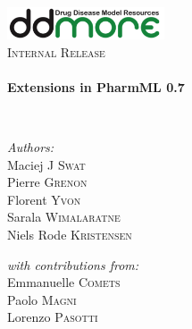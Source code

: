 \begin{titlepage}
\begin{center}

\includegraphics[width=0.35\textwidth]{./logo/ddmore_logo}~\\[1cm]

%
\textsc{\Large Internal Release}\\[0.5cm]

\HRule \\[0.4cm]
{ \huge \bfseries Extensions in PharmML 0.7 \\[0.4cm] }

\HRule \\[1.5cm]

\begin{minipage}{0.5\textwidth}
\begin{flushleft} \large
\emph{Authors:}\\
Maciej J \textsc{Swat}\\
Pierre \textsc{Grenon}\\
Florent \textsc{Yvon}\\
Sarala \textsc{Wimalaratne}\\
Niels Rode \textsc{Kristensen}\\
\end{flushleft}
\end{minipage}
\begin{minipage}{0.4\textwidth}
\begin{flushright} \large
\emph{with contributions from:} \\
Emmanuelle \textsc{Comets}\\
Paolo \textsc{Magni}\\
Lorenzo \textsc{Pasotti}\\
\end{flushright}
\end{minipage}


\end{center}
\end{titlepage}
